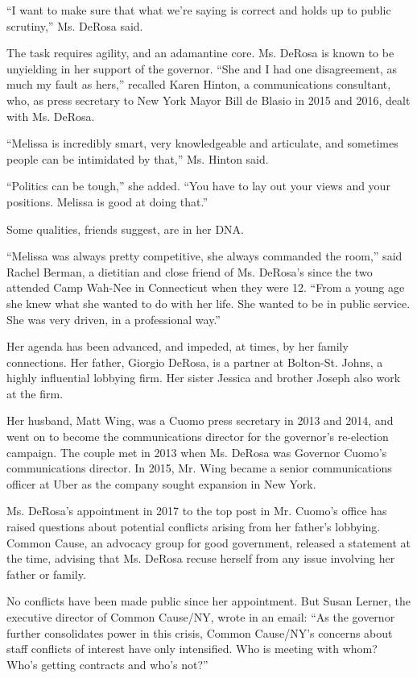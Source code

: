 ``I want to make sure that what we're saying is correct and holds up to
public scrutiny,'' Ms. DeRosa said.

The task requires agility, and an adamantine core. Ms. DeRosa is known
to be unyielding in her support of the governor. ``She and I had one
disagreement, as much my fault as hers,'' recalled Karen Hinton, a
communications consultant, who, as press secretary to New York Mayor
Bill de Blasio in 2015 and 2016, dealt with Ms. DeRosa.

``Melissa is incredibly smart, very knowledgeable and articulate, and
sometimes people can be intimidated by that,'' Ms. Hinton said.

``Politics can be tough,'' she added. ``You have to lay out your views
and your positions. Melissa is good at doing that.''

Some qualities, friends suggest, are in her DNA.

``Melissa was always pretty competitive, she always commanded the
room,'' said Rachel Berman, a dietitian and close friend of Ms. DeRosa's
since the two attended Camp Wah-Nee in Connecticut when they were 12.
``From a young age she knew what she wanted to do with her life. She
wanted to be in public service. She was very driven, in a professional
way.''

Her agenda has been advanced, and impeded, at times, by her family
connections. Her father, Giorgio DeRosa, is a partner at Bolton-St.
Johns, a highly influential lobbying firm. Her sister Jessica and
brother Joseph also work at the firm.

Her husband, Matt Wing, was a Cuomo press secretary in 2013 and 2014,
and went on to become the communications director for the governor's
re-election campaign. The couple met in 2013 when Ms. DeRosa was
Governor Cuomo's communications director. In 2015, Mr. Wing became a
senior communications officer at Uber as the company sought expansion in
New York.

Ms. DeRosa's appointment in 2017 to the top post in Mr. Cuomo's office
has raised questions about potential conflicts arising from her father's
lobbying. Common Cause, an advocacy group for good government, released
a statement at the time, advising that Ms. DeRosa recuse herself from
any issue involving her father or family.

No conflicts have been made public since her appointment. But Susan
Lerner, the executive director of Common Cause/NY, wrote in an email:
``As the governor further consolidates power in this crisis, Common
Cause/NY's concerns about staff conflicts of interest have only
intensified. Who is meeting with whom? Who's getting contracts and who's
not?''

